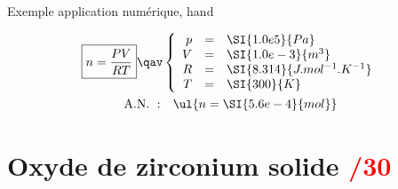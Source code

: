\documentclass[11pt]{book}
\begin{document}
{\begin{timpo}{Exemple application numérique, hand}
	\vspace*{-10pt}
	\begin{minipage}{0.45\linewidth}
		\begin{gather*}
			\boxed{n = \frac{PV}{RT}}
			\qav
			\left\{
			\begin{array}{rcl}
				p & = & \SI{1.0e5}{Pa}                \\
				V & = & \SI{1.0e-3}{m^3}              \\
				R & = & \SI{8.314}{J.mol^{-1}.K^{-1}} \\
				T & = & \SI{300}{K}
			\end{array}
			\right.\\
			\mathrm{A.N.~:}\quad
			\ul{n = \SI{5.6e-4}{mol}}
		\end{gather*}
	\end{minipage}
	\hfill
\end{timpo}
\newpage
}

\section{Oxyde de zirconium solide \hfill \textcolor{red}{/30}}
\label{sec:oxzir}
\end{document}
